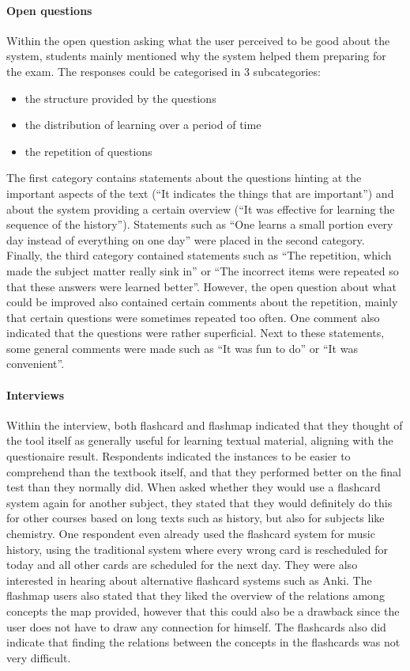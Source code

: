 \paragraph{Open questions} Within the open question asking what the user perceived to be good about the system, students mainly mentioned why the system helped them preparing for the exam. The responses could be categorised in 3 subcategories:
%
\begin{itemize}
    \item the structure provided by the questions
    \item the distribution of learning over a period of time
    \item the repetition of questions
\end{itemize}
%
The first category contains statements about the questions hinting at the important aspects of the text (``It indicates the things that are important'') and about the system providing a certain overview (``It was effective for learning the sequence of the history''). Statements such as ``One learns a small portion every day instead of everything on one day'' were placed in the second category. Finally, the third category contained statements such as ``The repetition, which made the subject matter really sink in'' or ``The incorrect items were repeated so that these answers were learned better''. However, the open question about what could be improved also contained certain comments about the repetition, mainly that certain questions were sometimes repeated too often. One comment also indicated that the questions were rather superficial. Next to these statements, some general comments were made such as ``It was fun to do'' or ``It was convenient''.

\paragraph{Interviews} Within the interview, both flashcard and flashmap indicated that they thought of the tool itself as generally useful for learning textual material, aligning with the questionaire result. Respondents indicated the instances to be easier to comprehend than the textbook itself, and that they performed better on the final test than they normally did. When asked whether they would use a flashcard system again for another subject, they stated that they would definitely do this for other courses based on long texts such as history, but also for subjects like chemistry. One respondent even already used the flashcard system for music history, using the traditional system where every wrong card is rescheduled for today and all other cards are scheduled for the next day. They were also interested in hearing about alternative flashcard systems such as Anki. The flashmap users also stated that they liked the overview of the relations among concepts the map provided, however that this could also be a drawback since the user does not have to draw any connection for himself. The flashcards also did indicate that finding the relations between the concepts in the flashcards was not very difficult.

